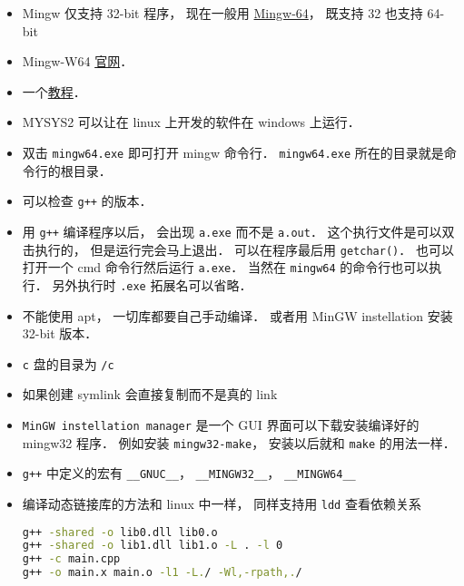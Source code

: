 
\begin{itemize}
\item Mingw 仅支持 32-bit 程序， 现在一般用 \href{https://en.wikipedia.org/wiki/Mingw-w64}{Mingw-64}， 既支持 32 也支持 64-bit
\item Mingw-W64 \href{https://www.mingw-w64.org/}{官网}．
\item 一个\href{https://www3.ntu.edu.sg/home/ehchua/programming/howto/Cygwin_HowTo.html}{教程}．
\item MYSYS2 可以让在 linux 上开发的软件在 windows 上运行．
\item 双击 \verb|mingw64.exe| 即可打开 mingw 命令行． \verb|mingw64.exe| 所在的目录就是命令行的根目录．
\item 可以检查 \verb|g++| 的版本．
\item 用 \verb|g++| 编译程序以后， 会出现 \verb|a.exe| 而不是 \verb|a.out|． 这个执行文件是可以双击执行的， 但是运行完会马上退出． 可以在程序最后用 \verb|getchar()|． 也可以打开一个 cmd 命令行然后运行 \verb|a.exe|． 当然在 \verb|mingw64| 的命令行也可以执行． 另外执行时 \verb|.exe| 拓展名可以省略．
\item 不能使用 apt， 一切库都要自己手动编译． 或者用 MinGW instellation 安装 32-bit 版本．
\item \verb|c| 盘的目录为 \verb|/c|
\item 如果创建 symlink 会直接复制而不是真的 link
\item \verb|MinGW instellation manager| 是一个 GUI 界面可以下载安装编译好的 mingw32 程序． 例如安装 \verb|mingw32-make|， 安装以后就和 \verb|make| 的用法一样．
\item \verb|g++| 中定义的宏有 \verb|__GNUC__|， \verb|__MINGW32__|， \verb|__MINGW64__|
\item 编译动态链接库的方法和 linux 中一样， 同样支持用 \verb|ldd| 查看依赖关系
\begin{lstlisting}[language=bash]
g++ -shared -o lib0.dll lib0.o
g++ -shared -o lib1.dll lib1.o -L . -l 0
g++ -c main.cpp
g++ -o main.x main.o -l1 -L./ -Wl,-rpath,./
\end{lstlisting}
\end{itemize}
